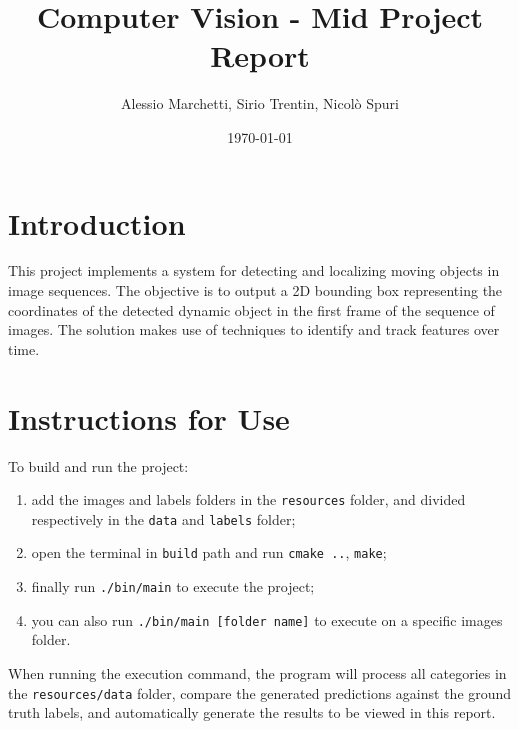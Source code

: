 \documentclass[a4paper,11pt]{article}
\title{Computer Vision - Mid Project Report}
\author{Alessio Marchetti, Sirio Trentin, Nicolò Spuri}
\date{\today}
\begin{document}
\maketitle

\section{Introduction}
This project implements a system for detecting and localizing moving objects in image sequences. The objective is to output a 2D bounding box representing the coordinates of the detected dynamic object in the first frame of the sequence of images. The solution makes use of techniques to identify and track features over time.

\section{Instructions for Use}
To build and run the project:

\begin{enumerate}
    \item add the images and labels folders in the \texttt{resources} folder, and divided respectively in the \texttt{data} and \texttt{labels} folder;
    \item open the terminal in \texttt{build} path and run \texttt{cmake ..}, \texttt{make};
    \item finally run \texttt{./bin/main} to execute the project;
    \item you can also run \texttt{./bin/main [folder name]} to execute on a specific images folder.
\end{enumerate}

When running the execution command, the program will process all categories in the \texttt{resources/data} folder, compare the generated predictions against the ground truth labels, and automatically generate the results to be viewed in this report.
\end{document}
